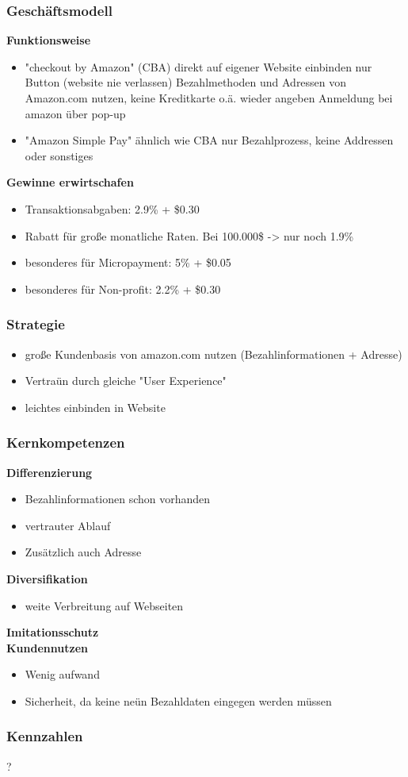 \subsubsection{ Geschäftsmodell}
\textbf{Funktionsweise}\\
	\begin{itemize}
	\item "checkout by Amazon" (CBA)
	\subitem  direkt auf eigener Website einbinden nur Button (website nie verlassen)
	\subitem  Bezahlmethoden und Adressen von Amazon.com nutzen, keine Kreditkarte o.ä. wieder angeben
	\subitem  Anmeldung bei amazon über pop-up
	\item "Amazon Simple Pay"
	\subitem  ähnlich wie CBA
	\subitem  nur Bezahlprozess, keine Addressen oder sonstiges
	\end{itemize}
	
\textbf{Gewinne erwirtschafen}\\
	\begin{itemize}
	\item Transaktionsabgaben: 2.9\% + \$0.30
	\item Rabatt für große monatliche Raten. Bei 100.000\$ -> nur noch 1.9\%
	\item besonderes für Micropayment: 5\% + \$0.05
	\item besonderes für Non-profit: 2.2\% + \$0.30
	\end{itemize}


\subsubsection{ Strategie}
	\begin{itemize}
	\item große Kundenbasis von amazon.com nutzen (Bezahlinformationen + Adresse)
	\item Vertraün durch gleiche "User Experience"
	\item leichtes einbinden in Website
	\end{itemize}

\subsubsection{ Kernkompetenzen}
\textbf{Differenzierung}\\
	\begin{itemize}
	\item Bezahlinformationen schon vorhanden
	\item vertrauter Ablauf
	\item Zusätzlich auch Adresse
	\end{itemize}
\textbf{Diversifikation}\\
	\begin{itemize}
	\item weite Verbreitung auf Webseiten
	\end{itemize}
\textbf{Imitationsschutz}\\
\textbf{Kundennutzen}\\
	\begin{itemize}
	\item Wenig aufwand
	\item Sicherheit, da keine neün Bezahldaten eingegen werden müssen
	\end{itemize}

\subsubsection{ Kennzahlen}
?
